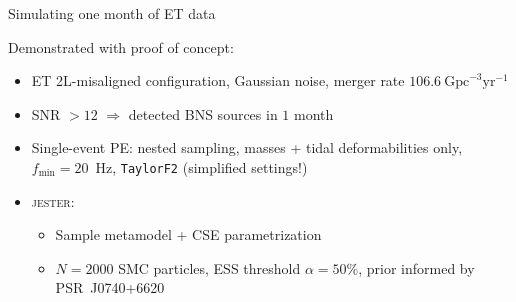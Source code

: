 \documentclass[usenames,dvipsnames,t]{beamer}
\begin{document}
\begin{frame}{Simulating one month of ET data}
  \def\x{3.5mm}

  Demonstrated with proof of concept:

  \vspace{3mm}

  \begin{itemize}
    \item ET 2L-misaligned configuration, Gaussian noise, merger rate $106.6~\mathrm{Gpc}^{-3}\mathrm{yr}^{-1}$

    \vspace{\x}

    \item SNR $>12$ $\Rightarrow$  detected BNS sources in $1$ month

    \vspace{\x}

    \item Single-event PE: nested sampling, masses + tidal deformabilities only, $f_{\mathrm{min}} = 20$~Hz, \texttt{TaylorF2} (simplified settings!)

    \vspace{\x}

    \item \textsc{jester}:
    \begin{itemize}
      \item Sample metamodel + CSE parametrization

      \vspace{2mm}
      
      \item $N = 2000$ SMC particles, ESS threshold $\alpha = 50\%$, prior informed by PSR~J0740+6620~
    \end{itemize}
  \end{itemize}

\end{frame}
\end{document}

